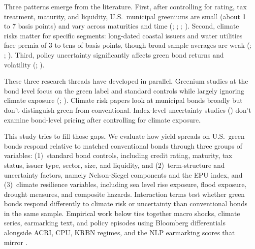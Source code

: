\documentclass[
  11pt,
]{article}
\makeatletter
\renewcommand{\subsection}{\@startsection{subsection}{2}{\z@}{-1.6ex\@plus -0.5ex \@minus -.2ex}{0.6ex \@plus.2ex}{\normalfont\large\bfseries\color{TitleBlue}}}
\makeatother
\begin{document}
\subsection{Summary and research gap}

Three patterns emerge from the literature. First, after controlling for rating, tax treatment, maturity, and liquidity, U.S.\ municipal greeniums are small (about 1 to 7 basis points) and vary across maturities and time (; ; ; ). Second, climate risks matter for specific segments: long-dated coastal issuers and water utilities face premia of 3 to tens of basis points, though broad-sample averages are weak (; ; ). Third, policy uncertainty significantly affects green bond returns and volatility (; ).

These three research threads have developed in parallel. Greenium studies at the bond level focus on the green label and standard controls while largely ignoring climate exposure (; ). Climate risk papers look at municipal bonds broadly but don't distinguish green from conventional. Index-level uncertainty studies () don't examine bond-level pricing after controlling for climate exposure.

This study tries to fill those gaps. We evaluate how yield spreads on U.S.\ green bonds respond relative to matched conventional bonds through three groups of variables: (1)~standard bond controls, including credit rating, maturity, tax status, issuer type, sector, size, and liquidity, and (2)~term-structure and uncertainty factors, namely Nelson-Siegel components and the EPU index, and (3)~climate resilience variables, including sea level rise exposure, flood exposure, drought measures, and composite hazards. Interaction terms test whether green bonds respond differently to climate risk or uncertainty than conventional bonds in the same sample. Empirical work below ties together macro shocks, climate series, earmarking text, and policy episodes using Bloomberg differentials alongside ACRI, CPU, KRBN regimes, and the NLP earmarking scores that mirror .
\end{document}
